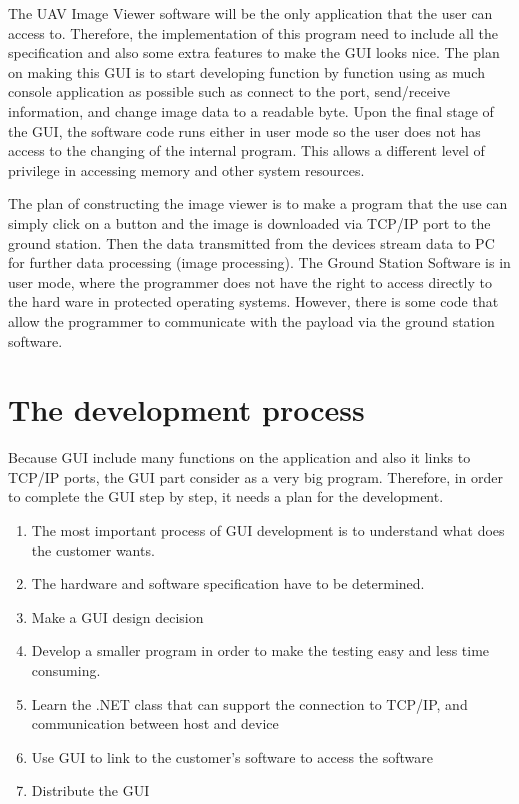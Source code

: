 \label{chap:implementation_ground_station }

The UAV Image Viewer software will be the only application that the user can access to. 
Therefore, the implementation of this program need to include all the specification and also some extra features to make the GUI looks nice.
The plan on making this GUI is to start developing function by function using as much console application as possible such as connect to the port, send/receive information, and change image data to a readable byte.
Upon the final stage of the GUI, the software code runs either in user mode so the user does not has access to the changing of the internal program\cite{tsuiK}. 
This allows a different level of privilege in accessing memory and other system resources. 

The plan of constructing the image viewer is to make a program that the use can simply click on a button and the image is downloaded via TCP/IP port to the ground station.
Then the data transmitted from the devices stream data to PC for further data processing (image processing).  
The Ground Station Software is in user mode, where the programmer does not have the right to access directly to the hard ware in protected operating systems. 
However, there is some code that allow the programmer to communicate with the payload via the ground station software.

\section{The development process} 
Because GUI include many functions on the application and also it links to TCP/IP ports, the GUI part consider as a very big program. 
Therefore, in order to complete the GUI step by step, it needs a plan for the development.
\flushleft
\begin{enumerate}


\item	The most important process of GUI development is to understand what does the customer wants. 

\item	The hardware and software specification have to be determined.
 
\item	Make a GUI design decision

\item Develop a smaller program in order to make the testing easy and less time consuming. 

\item	Learn the .NET class that can support the connection to TCP/IP, and communication between host and device

\item	Use GUI to link to the customer’s software to access the software

\item	Distribute the GUI
\end{enumerate}

